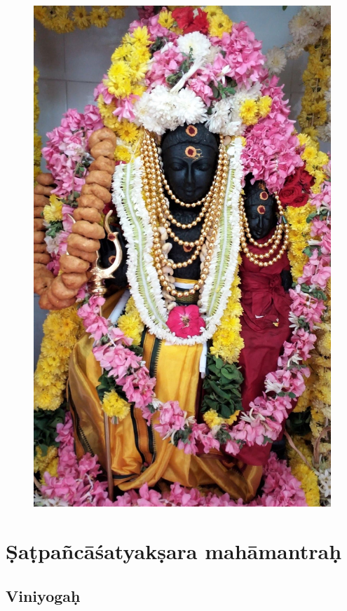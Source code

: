 \documentclass[11pt,oneside,a4paper]{article}
\begin{document}
\begin{figure}[ht]
  \includegraphics{svarnakarsana-bhairava.jpg}
\end{figure}
\clearpage

\section{Ṣaṭpañcāśatyakṣara mahāmantraḥ}
\subsection{Viniyogaḥ}
\end{document}
